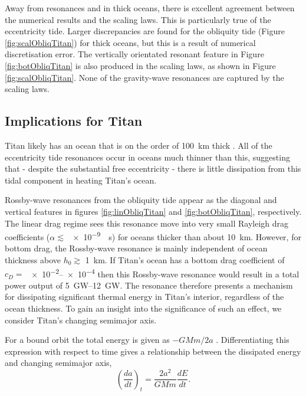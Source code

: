 Away from resonances and in thick oceans, there is excellent agreement between the numerical results and the scaling laws. This is particularly true of the eccentricity tide. Larger discrepancies are found for the obliquity tide (Figure \ref{fig:scalObliqTitan}) for thick oceans, but this is a result of numerical discretisation error. The vertically orientated resonant feature in Figure \ref{fig:botObliqTitan} is also produced in the scaling laws, as shown in Figure \ref{fig:scalObliqTitan}. None of the gravity-wave resonances are captured by the scaling laws. 

\subsection{Implications for Titan}

Titan likely has an ocean that is on the order of \SI{100}{\kilo\metre} thick \citep{sohl2014structural,baland2014titan}. All of the eccentricity tide resonances occur in oceans much thinner than this, suggesting that - despite the substantial free eccentricity - there is little dissipation from this tidal component in heating Titan's ocean.

Rossby-wave resonances from the obliquity tide appear as the diagonal and vertical features in figures \ref{fig:linObliqTitan} and \ref{fig:botObliqTitan}, respectively. The linear drag regime sees this resonance move into very small Rayleigh drag coefficients ($\alpha \lesssim$ \SI{e-9}{\per\second}) for oceans thicker than about \SI{10}{\kilo\metre}. However, for bottom drag, the Rossby-wave resonance is mainly independent of ocean thickness above $h_0 \gtrsim$ \SI{1}{\kilo\metre}. If Titan's ocean has a bottom drag coefficient of $c_D =$ \numrange{e-2}{e-4} then this Rossby-wave resonance would result in a total power output of \SIrange{5}{12}{\giga\watt}. The resonance therefore presents a mechanism for dissipating significant thermal energy in Titan's interior, regardless of the ocean thickness. To gain an insight into the significance of such an effect, we consider Titan's changing semimajor axis.

For a bound orbit the total energy is given as $-GMm/2a$ \citep{murray1999solar}. Differentiating this expression with respect to time gives a relationship between the dissipated energy and changing semimajor axis,
\begin{equation}
\left( \dfrac{da}{dt} \right)_t = \dfrac{2a^2}{GM m}\dfrac{dE}{dt}.
\label{eq:adot_t}
\end{equation}

